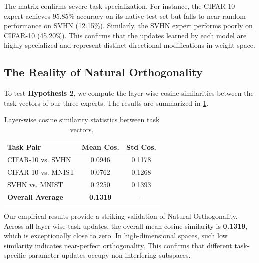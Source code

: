 \documentclass{article}
\begin{document}
The matrix confirms severe task specialization. For instance, the CIFAR-10 expert achieves 95.85\% accuracy on its native test set but falls to near-random performance on SVHN (12.15\%). Similarly, the SVHN expert performs poorly on CIFAR-10 (45.20\%). This confirms that the updates learned by each model are highly specialized and represent distinct directional modifications in weight space.

\subsection{The Reality of Natural Orthogonality}

To test \textbf{Hypothesis 2}, we compute the layer-wise cosine similarities between the task vectors of our three experts. The results are summarized in \cref{tab:cosine_similarity}.

\begin{table}[h]
\caption{Layer-wise cosine similarity statistics between task vectors.}
\label{tab:cosine_similarity}
\vskip 0.05in
\begin{center}
\begin{small}
\begin{sc}
\begin{tabular}{lcc}
\toprule
Task Pair & Mean Cos. & Std Cos. \\
\midrule
CIFAR-10 vs. SVHN & 0.0946 & 0.1178 \\
CIFAR-10 vs. MNIST & 0.0762 & 0.1268 \\
SVHN vs. MNIST & 0.2250 & 0.1393 \\
\midrule
\textbf{Overall Average} & \textbf{0.1319} & -- \\
\bottomrule
\end{tabular}
\end{sc}
\end{small}
\end{center}
\vskip -0.15in
\end{table}

Our empirical results provide a striking validation of Natural Orthogonality. Across all layer-wise task updates, the overall mean cosine similarity is \textbf{0.1319}, which is exceptionally close to zero. In high-dimensional spaces, such low similarity indicates near-perfect orthogonality. This confirms that different task-specific parameter updates occupy non-interfering subspaces.
\end{document}
